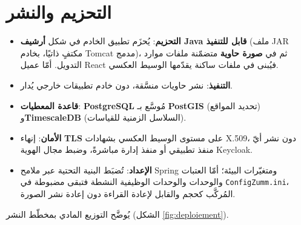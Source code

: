 \section{التحزيم والنشر}
\begin{itemize}
  \item \textbf{التحزيم}: يُحزَم تطبيق الخادم في شكل \textbf{أرشيف Java قابل للتنفيذ} (ملف JAR مكتفٍ ذاتيًا، بخادم Tomcat مدمج)، ثم في \textbf{صورة حاوية} متضمّنة ملفات موارد التدويل. أمّا عميل React فيُبنى في ملفات ساكنة يقدّمها الوسيط العكسي.
  \item \textbf{التنفيذ}: نشر حاويات منسَّقة، دون خادم تطبيقات خارجي يُدار.
  \item \textbf{قاعدة المعطيات}: \textbf{PostgreSQL} مُوسَّع بـ \textbf{PostGIS} (تحديد المواقع) و\textbf{TimescaleDB} (السلاسل الزمنية للقياسات).
  \item \textbf{الأمان}: إنهاء \textbf{TLS} على مستوى الوسيط العكسي بشهادات X.509، دون نشر أيّ منفذ تطبيقي أو منفذ إدارة مباشرةً، وضبط مجال الهوية Keycloak.
  \item \textbf{الإعداد}: تُضبَط البنية التحتية عبر ملامح Spring ومتغيّرات البيئة؛ أمّا العتبات والوحدات والوحدات الوظيفية النشطة فتبقى مضبوطة في \texttt{ConfigZumm.ini}، المُركَّب كحجم والقابل لإعادة القراءة دون إعادة نشر الصورة.
\end{itemize}
يُوضَّح التوزيع المادي بمخطّط النشر (الشكل \ref{fig:deploiement}).
